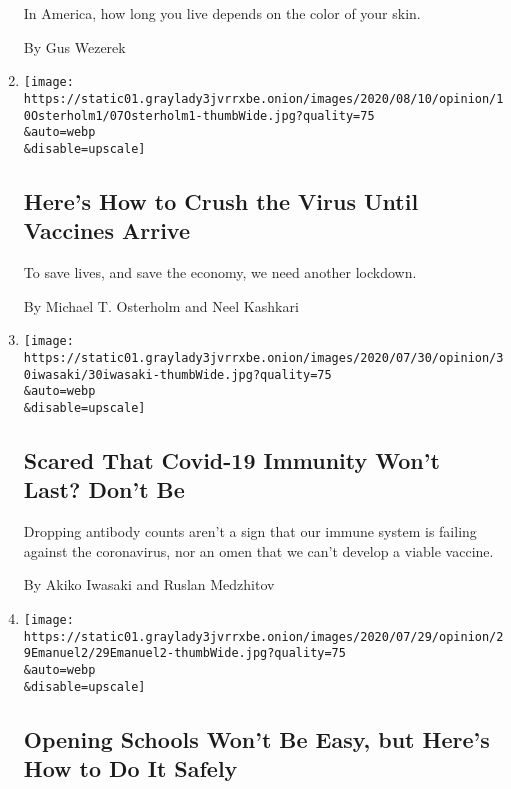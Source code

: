 \begin{enumerate}
  In America, how long you live depends on the color of your skin.

  By Gus Wezerek
\item
  \href{/2020/08/07/opinion/coronavirus-lockdown-unemployment-death.html}{}

  \texttt{[image: https://static01.graylady3jvrrxbe.onion/images/2020/08/10/opinion/10Osterholm1/07Osterholm1-thumbWide.jpg?quality=75\\\&auto=webp\\\&disable=upscale]}

  \hypertarget{heres-how-to-crush-the-virus-until-vaccines-arrive}{%
  \subsection{Here's How to Crush the Virus Until Vaccines
  Arrive}\label{heres-how-to-crush-the-virus-until-vaccines-arrive}}

  To save lives, and save the economy, we need another lockdown.

  By Michael T. Osterholm and Neel Kashkari
\item
  \href{/2020/07/31/opinion/coronavirus-antibodies-immunity.html}{}

  \texttt{[image: https://static01.graylady3jvrrxbe.onion/images/2020/07/30/opinion/30iwasaki/30iwasaki-thumbWide.jpg?quality=75\\\&auto=webp\\\&disable=upscale]}

  \hypertarget{scared-that-covid-19-immunity-wont-last-dont-be}{%
  \subsection{Scared That Covid-19 Immunity Won't Last? Don't
  Be}\label{scared-that-covid-19-immunity-wont-last-dont-be}}

  Dropping antibody counts aren't a sign that our immune system is
  failing against the coronavirus, nor an omen that we can't develop a
  viable vaccine.

  By Akiko Iwasaki and Ruslan Medzhitov
\item
  \href{/2020/07/29/opinion/coronavirus-schools-reopen.html}{}

  \texttt{[image: https://static01.graylady3jvrrxbe.onion/images/2020/07/29/opinion/29Emanuel2/29Emanuel2-thumbWide.jpg?quality=75\\\&auto=webp\\\&disable=upscale]}

  \hypertarget{opening-schools-wont-be-easy-but-heres-how-to-do-it-safely}{%
  \subsection{Opening Schools Won't Be Easy, but Here's How to Do It
  Safely}\label{opening-schools-wont-be-easy-but-heres-how-to-do-it-safely}}


\end{enumerate}
